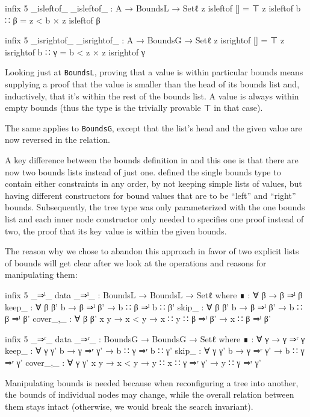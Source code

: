 \documentclass{scrartcl}
\newenvironment{code}{\verbatim}{\endverbatim}
\begin{document}
\begin{code}
infix 5 _isleftof_
_isleftof_ : A → BoundsL → Setℓ
z isleftof []     = ⊤
z isleftof b ∷ β  = z < b × z isleftof β

infix 5 _isrightof_
_isrightof_ : A → BoundsG → Setℓ
z isrightof []     = ⊤
z isrightof b ∷ γ  = b < z × z isrightof γ
\end{code}

Looking just at \verb/BoundsL/, proving that a value is within
particular bounds means supplying a proof that the value is smaller
than the head of its bounds list and, inductively, that it's within the
rest of the bounds list. A value is always within empty bounds (thus
the type is the trivially provable ⊤ in that case).

The same applies to \verb/BoundsG/, except that the list's head and
the given value are now reversed in the relation.

A key difference between the bounds definition in \cite{eha2009} and
this one is that there are now two bounds lists instead of just
one. \cite{eha2009} defined the single bounds type to contain either
constraints in any order, by not keeping simple lists of values, but
having different constructors for bound values that are to be ``left''
and ``right'' bounds. Subsequently, the tree type was only
parameterized with the one bounds list and each inner node constructor
only needed to specifies one proof instead of two, the proof that its key
value is within the given bounds.

The reason why we chose to abandon this approach in favor of two
explicit lists of bounds will get clear after we look at the
operations and reasons for manipulating them:

\begin{code}
infix 5 _⇒ˡ_
data _⇒ˡ_ : BoundsL → BoundsL → Setℓ where
  ∎      : ∀ {β} → β ⇒ˡ β
  keep_  : ∀ {β β' b} → β ⇒ˡ β' → b ∷ β ⇒ˡ b ∷ β'
  skip_  : ∀ {β β' b} → β ⇒ˡ β' → b ∷ β ⇒ˡ β'
  cover_,_  : ∀ {β β' x y} → x < y → x ∷ y ∷ β ⇒ˡ β'
         → x ∷ β ⇒ˡ β'

infix 5 _⇒ʳ_
data _⇒ʳ_ : BoundsG → BoundsG → Setℓ where
  ∎      : ∀ {γ} → γ ⇒ʳ γ
  keep_  : ∀ {γ γ' b} → γ ⇒ʳ γ' → b ∷ γ ⇒ʳ b ∷ γ'
  skip_  : ∀ {γ γ' b} → γ ⇒ʳ γ' → b ∷ γ ⇒ʳ γ'
  cover_,_  : ∀ {γ γ' x y} → x < y → y ∷ x ∷ γ ⇒ʳ γ'
         → y ∷ γ ⇒ʳ γ'
\end{code}

Manipulating bounds is needed because when reconfiguring a tree into
another, the bounds of individual nodes may change, while the overall
relation between them stays intact (otherwise, we would break the
search invariant).
\end{document}
